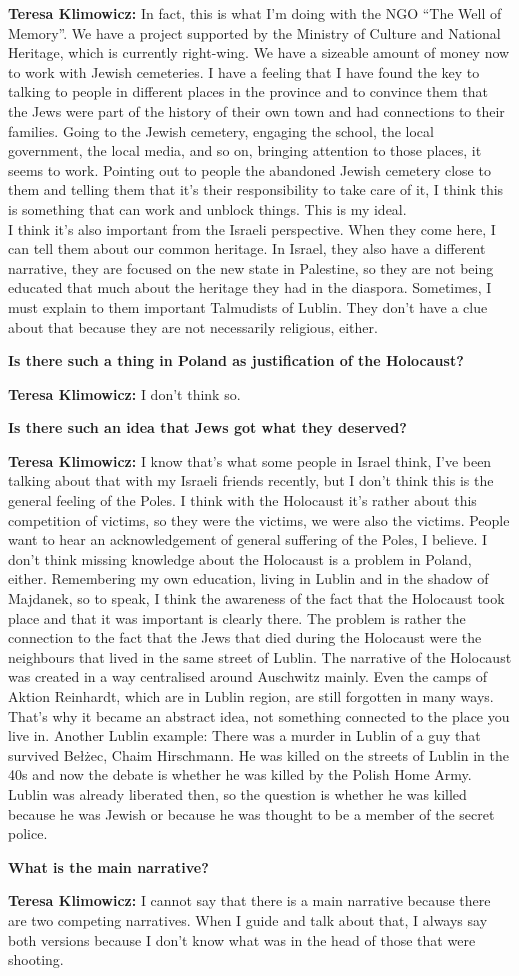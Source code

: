 \textbf{Teresa Klimowicz:} In fact, this is what I'm doing with the NGO ``The Well of Memory''. We have a project supported by the Ministry of Culture and National Heritage, which is currently right-wing. We have a sizeable amount of money now to work with Jewish cemeteries. I have a feeling that I have found the key to talking to people in different places in the province and to convince them that the Jews were part of the history of their own town and had connections to their families. Going to the Jewish cemetery, engaging the school, the local government, the local media, and so on, bringing attention to those places, it seems to work. Pointing out to people the abandoned Jewish cemetery close to them and telling them that it's their responsibility to take care of it, I think this is something that can work and unblock things. This is my ideal.\\ 
I think it's also important from the Israeli perspective. When they come here, I can tell them about our common heritage. In Israel, they also have a different narrative, they are focused on the new state in Palestine, so they are not being educated that much about the heritage they had in the diaspora. Sometimes, I must explain to them important Talmudists of Lublin. They don't have a clue about that because they are not necessarily religious, either. 

\textbf{Is there such a thing in Poland as justification of the Holocaust?}  

\textbf{Teresa Klimowicz:} I don't think so.  

\textbf{Is there such an idea that Jews got what they deserved?}

\textbf{Teresa Klimowicz:} I know that's what some people in Israel think, I've been talking about that with my Israeli friends recently, but I don't think this is the general feeling of the Poles. I think with the Holocaust it’s rather about this competition of victims, so they were the victims, we were also the victims. People want to hear an acknowledgement of general suffering of the Poles, I believe. I don't think missing knowledge about the Holocaust is a problem in Poland, either. Remembering my own education, living in Lublin and in the shadow of Majdanek, so to speak, I think the awareness of the fact that the Holocaust took place and that it was important is clearly there. The problem is rather the connection to the fact that the Jews that died during the Holocaust were the neighbours that lived in the same street of Lublin. The narrative of the Holocaust was created in a way centralised around Auschwitz mainly. Even the camps of Aktion Reinhardt, which are in Lublin region, are still forgotten in many ways. That's why it became an abstract idea, not something connected to the place you live in. Another Lublin example: There was a murder in Lublin of a guy that survived Bełżec, Chaim Hirschmann. He was killed on the streets of Lublin in the 40s and now the debate is whether he was killed by the Polish Home Army. Lublin was already liberated then, so the question is whether he was killed because he was Jewish or because he was thought to be a member of the secret police.  

\textbf{What is the main narrative?}  

\textbf{Teresa Klimowicz:} I cannot say that there is a main narrative because there are two competing narratives. When I guide and talk about that, I always say both versions because I don't know what was in the head of those that were shooting. 